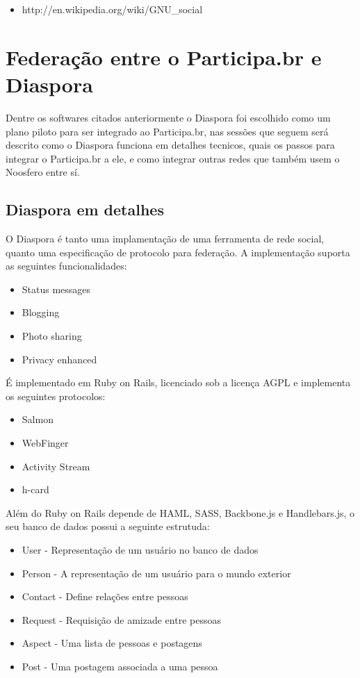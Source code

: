\documentclass[12pt]{article}
\begin{document}
\begin{itemize}
  \item http://en.wikipedia.org/wiki/GNU\_social
\end{itemize}

\section{Federação entre o Participa.br e Diaspora}

Dentre os softwares citados anteriormente o Diaspora foi escolhido como um
plano piloto para ser integrado ao Participa.br, nas sessões que seguem será
descrito como o Diaspora funciona em detalhes tecnicos, quais os passos para
integrar o Participa.br a ele, e como integrar outras redes que também usem
o Noosfero entre sí.

\subsection{Diaspora em detalhes}


O Diaspora é tanto uma implamentação de uma ferramenta de rede social, quanto
uma especificação de protocolo para federação. A implementação suporta as
seguintes funcionalidades:

\begin{itemize}
  \item Status messages
  \item Blogging
  \item Photo sharing
  \item Privacy enhanced
\end{itemize}

É implementado em Ruby on Rails, licenciado sob a licença AGPL e implementa os
seguintes protocolos:

\begin{itemize}
  \item Salmon
  \item WebFinger
  \item Activity Stream
  \item h-card
\end{itemize}

Além do Ruby on Rails depende de HAML, SASS, Backbone.js e Handlebars.js, o
seu banco de dados possui a seguinte estrutuda:

\begin{itemize}
  \item User - Representação de um usuário no banco de dados
  \item Person - A representação de um usuário para o mundo exterior
  \item Contact - Define relações entre pessoas
  \item Request - Requisição de amizade entre pessoas
  \item Aspect - Uma lista de pessoas e postagens
  \item Post - Uma postagem associada a uma pessoa
\end{itemize}
\end{document}
